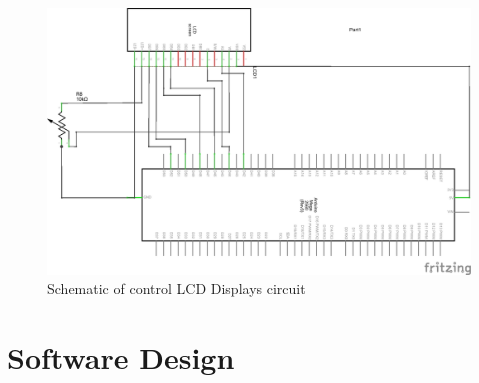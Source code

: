 \begin{figure}[H]
	\centering
	\includegraphics[width=\maxwidth{15cm}, keepaspectratio]{Chapters/Fig/Deltarobot_LCD_16x2_schem.png}
	\caption{Schematic of control LCD Displays circuit}
	\label{fig:Deltarobot_LCD_16x2_schem}
\end{figure}
\section{Software Design}

